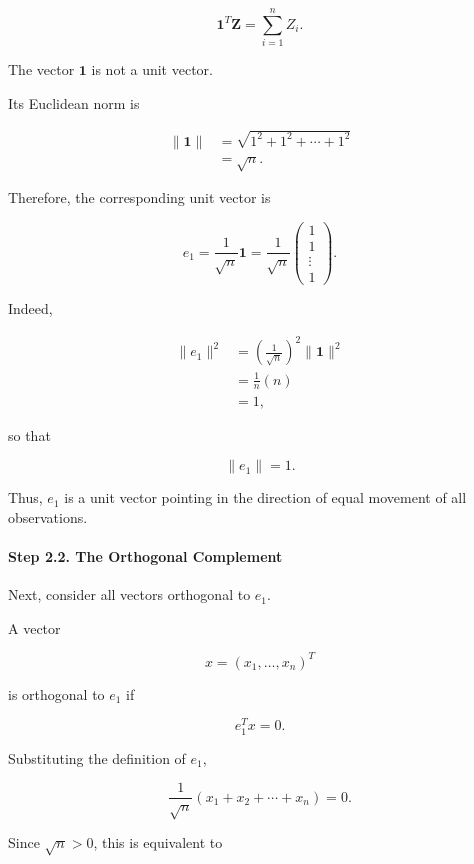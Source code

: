 \documentclass[11pt]{article}
\begin{document}
\begin{mdframed}[
		linewidth=0.8pt,
		roundcorner=6pt,
		backgroundcolor=gray!5,
		linecolor=gray!60,
		innertopmargin=10pt,
		innerbottommargin=10pt,
		innerleftmargin=10pt,
		innerrightmargin=10pt
		]
		\[
		\mathbf1^T\mathbf Z
		=
		\sum_{i=1}^{n}Z_i.
		\]
		
		The vector $\mathbf1$ is not a unit vector.
		
		Its Euclidean norm is
		
		\[
		\begin{aligned}
			\|\mathbf1\|
			&=
			\sqrt{
				1^2+1^2+\cdots+1^2
			}
			\\
			&=
			\sqrt n.
		\end{aligned}
		\]
		
		Therefore, the corresponding unit vector is
		
		\[
		\boxed{
			e_1
			=
			\frac1{\sqrt n}
			\mathbf1
			=
			\frac1{\sqrt n}
			\begin{pmatrix}
				1\\
				1\\
				\vdots\\
				1
			\end{pmatrix}.
		}
		\]
		
		Indeed,
		
		\[
		\begin{aligned}
			\|e_1\|^2
			&=
			\left(
			\frac1{\sqrt n}
			\right)^2
			\|\mathbf1\|^2
			\\
			&=
			\frac1n(n)
			\\
			&=
			1,
		\end{aligned}
		\]
		
		so that
		
		\[
		\boxed{\|e_1\|=1.}
		\]
		
		Thus, $e_1$ is a unit vector pointing in the direction of equal movement of
		all observations.
		
		\paragraph{Step 2.2. The Orthogonal Complement}
		
		Next, consider all vectors orthogonal to $e_1$.
		
		A vector
		
		\[
		x=(x_1,\ldots,x_n)^T
		\]
		
		is orthogonal to $e_1$ if
		
		\[
		e_1^Tx=0.
		\]
		
		Substituting the definition of $e_1$,
		
		\[
		\frac1{\sqrt n}
		(x_1+x_2+\cdots+x_n)=0.
		\]
		
		Since $\sqrt n>0$, this is equivalent to
		

\end{mdframed}
\end{document}
